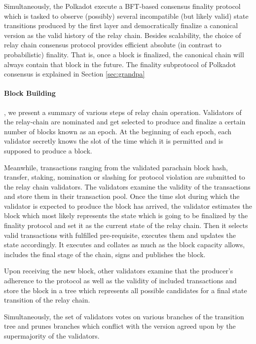 Simultaneously, the Polkadot execute a BFT-based consensus finality protocol which is tasked to observe (possibly) several incompatible (but likely valid) state transitions produced by the first layer and democratically finalize a canonical version as the valid history of the relay chain. Besides scalability, the choice of relay chain consensus protocol provides efficient absolute (in contrast to probabilistic) finality. That is, once a block is finalized, the canonical chain will always contain that block in the future. The finality subprotocol of Polkadot consensus is explained in Section
\ref{sec:grandpa}

\paragraph{Block Building}\label{sec:relaychainblockproduction}
 , we present a summary of various steps of relay chain operation. Validators of the relay-chain are nominated and get selected to produce and finalize a certain number of blocks known as an epoch. At the beginning of each epoch, each validator secretly knows the slot of the time which it is permitted and is supposed to produce a block.

Meanwhile, transactions ranging from the validated parachain block hash, transfer, staking, nomination or slashing for protocol violation are submitted to the relay chain validators. The validators examine the validity of the transactions and store them in their transaction pool. Once the time slot during which the validator is expected to produce the block has arrived, the validator estimates the block which most likely represents the state which is going to be finalized by the finality protocol and set it as the current state of the relay chain. Then it selects valid transactions with fulfilled pre-requisite, executes them and updates the state accordingly. It executes and collates as much as the block capacity allows, includes the final stage of
the chain, signs and publishes the block.

Upon receiving the new block, other validators examine that the producer's adherence to the protocol as well as the validity of included transactions and store the block in a tree which represents all possible candidates for a final state transition of the relay chain. 

Simultaneously, the set of validators votes on various branches of the transition tree and prunes branches which conflict with the version agreed upon by the supermajority of the validators.
